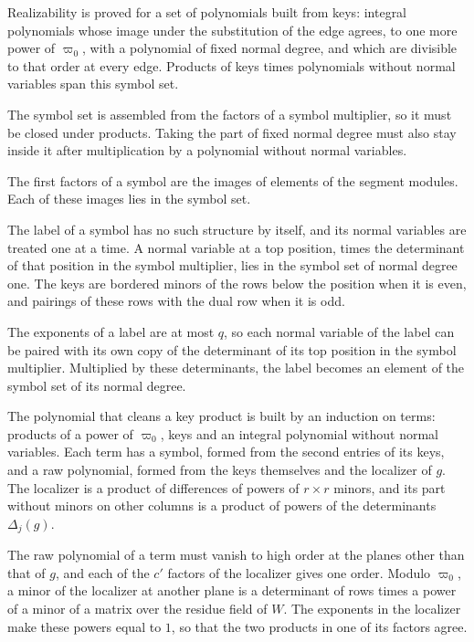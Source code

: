 Realizability is proved for a set of polynomials built from keys: integral polynomials whose image
under the substitution of the edge agrees, to one more power of $\varpi_0$, with a polynomial of fixed
normal degree, and which are divisible to that order at every edge. Products of keys times polynomials
without normal variables span this symbol set.

The symbol set is assembled from the factors of a symbol multiplier, so it must be closed under
products. Taking the part of fixed normal degree must also stay inside it after multiplication by a
polynomial without normal variables.

The first factors of a symbol are the images of elements of the segment modules. Each of these images
lies in the symbol set.

The label of a symbol has no such structure by itself, and its normal variables are treated one at a
time. A normal variable at a top position, times the determinant of that position in the symbol
multiplier, lies in the symbol set of normal degree one. The keys are bordered minors of the rows below
the position when it is even, and pairings of these rows with the dual row when it is odd.

The exponents of a label are at most $q$, so each normal variable of the label can be paired with its
own copy of the determinant of its top position in the symbol multiplier. Multiplied by these
determinants, the label becomes an element of the symbol set of its normal degree.

The polynomial that cleans a key product is built by an induction on terms: products of a power of
$\varpi_0$, keys and an integral polynomial without normal variables. Each term has a symbol, formed
from the second entries of its keys, and a raw polynomial, formed from the keys themselves and the
localizer of $g$. The localizer is a product of differences of powers of $r\times r$ minors, and its
part without minors on other columns is a product of powers of the determinants $\Delta_j(g)$.

The raw polynomial of a term must vanish to high order at the planes other than that of $g$, and each
of the $c'$ factors of the localizer gives one order. Modulo $\varpi_0$, a minor of the localizer at
another plane is a determinant of rows times a power of a minor of a matrix over the residue field of
$W$. The exponents in the localizer make these powers equal to $1$, so that the two products in one of
its factors agree.

